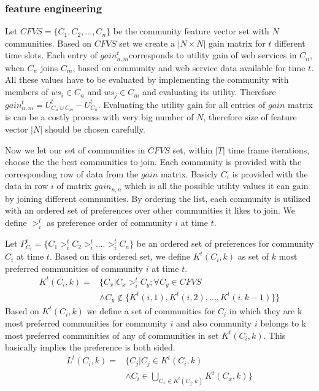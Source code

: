 \documentclass[10pt,journal,cspaper,compsoc]{IEEEtran}
\begin{document}
\subsubsection{feature engineering}\label{sss:feng}
Let $CFVS = \{C_1, C_2,..., C_n\}$ be the community feature vector set with $N$ communities. Based on $CFVS$ set we create a $|N \times N|$ gain matrix for $t$ different time slots. Each entry of $gain_{n,m}^{t}$corresponds to utility gain of web services in $C_n$, when $C_n$ joins $C_m$, based on community and web service data available for time $t$. All these values have to be evaluated by implementing the community with members of $ws_i \in C_n$ and $ws_j \in C_m$ and evaluating its utility. Therefore $gain_{n,m}^{t} = U_{C_n \cup C_m}^{t} - U_{C_{n}}^{t}$. Evaluating the utility gain for all entries of $gain$ matrix is can be a costly process with very big number of $N$, therefore size of feature vector $|N|$ should be chosen carefully. 

Now we let our set of communities in $CFVS$ set, within $|T|$ time frame iterations, choose the the best communities to join. Each community is provided with the corresponding row of data from the $gain$ matrix. Basicly $C_i$ is provided with the data in row $i$ of matrix $gain_{n,n}$ which is all the possible utility values it can gain by joining different communities. By ordering the list, each community is utilized with an ordered set of preferences over other communities it likes to join. We define $>_{i}^t$ as preference order of community $i$ at time $t$.

Let $P_{C_i}^t = \{C_1 >_{i}^t C_2 >_{i}^t .... >_{i}^t C_n\}$ be an ordered set of preferences for community $C_i$ at time $t$. Based on this ordered set, we define $K^t(C_i, k)$ as set of $k$ most preferred communities of community $i$ at time $t$.
\begin{equation}\label{h_t_pref_top}
\begin{split}				
K^t(C_i, k) = &\Big\{C_x | C_x >_{i}^t C_y; \forall C_y \in CFVS\ \\
				      &\wedge C_y \notin \{K^t(i, 1),K^t(i, 2),...,K^t(i, k-1)\} \Big\}				
\end{split}
\end{equation}
Based on $K^t(C_i, k)$ we define a set of communities for $C_i$ in which they are k most preferred communities for community $i$ and also community $i$ belongs to k most preferred communities of any of communities in set $K^t(C_i, k)$. This basically implies the preference is both sided.
\begin{equation}\label{l_t_top_both}
\begin{split}	
L^t(C_i,k) = &\Big\{C_j | C_j \in K^t(C_i, k) \\
             &\wedge C_i \in \bigcup_{C_x \in K^t(C_j, k)}K^t(C_x, k)\Big\}
\end{split}
\end{equation}
\end{document}
